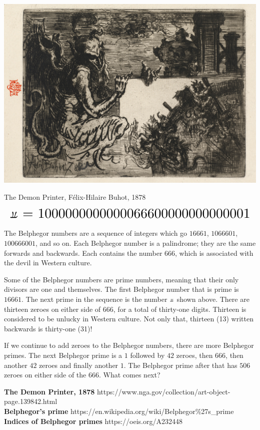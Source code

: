 \documentclass[12pt]{article}
\begin{document}
\begin{center}

\vfill

\includegraphics[scale=0.1]{img/the_demon_printer_2008.1.1}

The Demon Printer, Félix-Hilaire Buhot, 1878
\end{center}

\vfill

$$
\scalebox{2}{\rotatebox[origin=c]{180}{$\pi$} = 1000000000000066600000000000001}
$$

\vfill

\justifying
{{\large The Belphegor numbers are a sequence of integers which go $16661$, $1066601$, $100666001$, and so on.
Each Belphegor number is a palindrome; they are the same forwards and backwards.
Each contains the number $666$, which is associated with the devil in Western culture.}

\vfill

{\large Some of the Belphegor numbers are prime numbers, meaning that their only divisors are one and themselves.
The first Belphegor number that is prime is $16661$.
The next prime in the sequence is the number $\rotatebox[origin=c]{180}{$\pi$}$ shown above.
There are thirteen zeroes on either side of $666$, for a total of thirty-one digits.
Thirteen is considered to be unlucky in Western culture.
Not only that, thirteen (13) written backwards is thirty-one (31)!}

\vfill

{\large If we continue to add zeroes to the Belphegor numbers, there are more Belphegor primes.
The next Belphegor prime is a $1$ followed by $42$ zeroes, then $666$, then another $42$ zeroes and finally another $1$. The Belphegor prime after that has $506$ zeroes on either side of the $666$. What comes next?}}


\vfill

\noindent \textbf{The Demon Printer, 1878} https://www.nga.gov/collection/art-object-page.139842.html\\
\textbf{Belphegor's prime} https://en.wikipedia.org/wiki/Belphegor\%27s\_prime\\
\textbf{Indices of Belphegor primes} https://oeis.org/A232448
\end{document}
